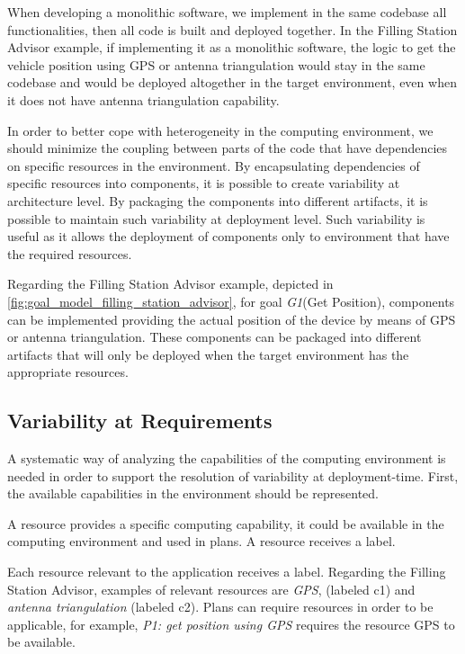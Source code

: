 When developing a monolithic software, we implement in the same codebase all functionalities, then all code is built and deployed together.
In the Filling Station Advisor example, if implementing it as a monolithic software, the logic to get the vehicle position using GPS or antenna triangulation would stay in the same codebase and would be deployed altogether in the target environment, even when it does not have antenna triangulation capability.


In order to better cope with heterogeneity in the computing environment, we should minimize the coupling between parts of the code that have dependencies on specific resources in the environment.
By encapsulating dependencies of specific resources into components, it is possible to create variability at architecture level. By packaging the components into different artifacts, it is possible to maintain such variability at deployment level. Such variability is useful as it allows the deployment of components only to environment that have the required resources.

Regarding the Filling Station Advisor example, depicted in \ref{fig:goal_model_filling_station_advisor}, for goal \emph{G1}(Get Position), components can be implemented providing the actual position of the device by means of GPS or antenna triangulation. These components can be packaged into different artifacts that will only be deployed when the target environment has the appropriate resources.

\subsection{Variability at Requirements}
\label{context}

A systematic way of analyzing the capabilities of the computing environment is needed in order to support the resolution of variability at deployment-time. First, the available capabilities in the environment should be represented.

\begin{defn}[Resource]

  A resource provides a specific computing capability, it could be available in the computing environment and used in plans. A resource receives a label.

\end{defn}

Each resource relevant to the application receives a label.
Regarding the Filling Station Advisor, examples of relevant resources are \emph{GPS}, (labeled c1) and \emph{antenna triangulation} (labeled c2). Plans can require resources in order to be applicable, for example, \emph{P1: get position using GPS} requires the resource GPS to be available.

